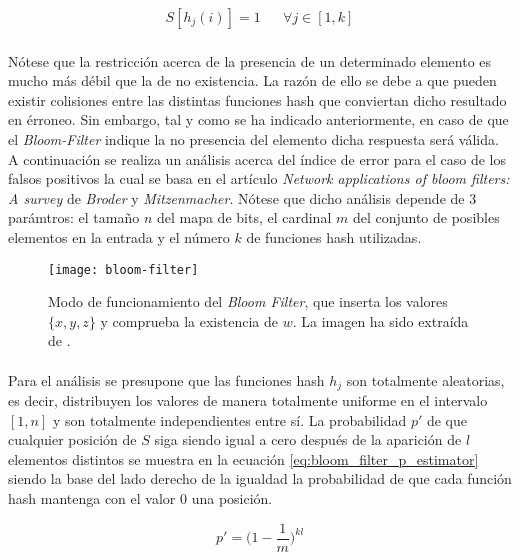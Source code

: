 \documentclass{subfiles}
\begin{document}
      \begin{align}
      \label{eq:bloom_filter_update}
        S[h_j(i)] = 1 && \forall j \in [1,k]
      \end{align}

      \paragraph{}
      Nótese que la restricción acerca de la presencia de un determinado elemento es mucho más débil que la de no existencia. La razón de ello se debe a que pueden existir colisiones entre las distintas funciones hash que conviertan dicho resultado en érroneo. Sin embargo, tal y como se ha indicado anteriormente, en caso de que el \emph{Bloom-Filter} indique la no presencia del elemento dicha respuesta será válida. A continuación se realiza un análisis acerca del índice de error para el caso de los falsos positivos la cual se basa en el artículo \emph{Network applications of bloom filters: A survey} \cite{broder2004network} de \emph{Broder} y \emph{Mitzenmacher}. Nótese que dicho análisis depende de 3 parámtros: el tamaño $n$ del mapa de bits, el cardinal $m$ del conjunto de posibles elementos en la entrada y el número $k$ de funciones hash utilizadas.

      \begin{figure}
        \centering
        \texttt{[image: bloom-filter]}
        \caption{Modo de funcionamiento del \emph{Bloom Filter}, que inserta los valores $\{ x, y, z\}$ y comprueba la existencia de $w$. La imagen ha sido extraída de \cite{wiki:Bloom_filter}.}
        \label{fig:bloom_filter}
      \end{figure}

      \paragraph{}
      Para el análisis se presupone que las funciones hash $h_j$ son totalmente aleatorias, es decir, distribuyen los valores de manera totalmente uniforme en el intervalo $[1,n]$ y son totalmente independientes entre sí. La probabilidad $p'$ de que cualquier posición de $S$ siga siendo igual a cero después de la aparición de $l$ elementos distintos se muestra en la ecuación \eqref{eq:bloom_filter_p_estimator} siendo la base del lado derecho de la igualdad la probabilidad de que cada función hash mantenga con el valor $0$ una posición.

      \begin{equation}
      \label{eq:bloom_filter_p_estimator}
       p' = \bigg(1-\frac{1}{m}\bigg)^{kl}
      \end{equation}
\end{document}

